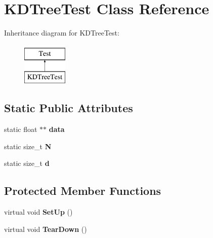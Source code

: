\hypertarget{classKDTreeTest}{\section{K\-D\-Tree\-Test Class Reference}
\label{classKDTreeTest}
}
Inheritance diagram for K\-D\-Tree\-Test\-:\begin{figure}[H]
\begin{center}
\leavevmode
\includegraphics[height=2.000000cm]{classKDTreeTest}
\end{center}
\end{figure}
\subsection*{Static Public Attributes}
\begin{DoxyCompactItemize}
\item 
\hypertarget{classKDTreeTest_a836729a070eb9537d0cc9c960e4e6ebb}{static float $\ast$$\ast$ {\bfseries data}}\label{classKDTreeTest_a836729a070eb9537d0cc9c960e4e6ebb}

\item 
\hypertarget{classKDTreeTest_aeb538469cef4399ec6911856a4c7e407}{static size\-\_\-t {\bfseries N}}\label{classKDTreeTest_aeb538469cef4399ec6911856a4c7e407}

\item 
\hypertarget{classKDTreeTest_ababb08a55d11ed0df1be2befe4bdba49}{static size\-\_\-t {\bfseries d}}\label{classKDTreeTest_ababb08a55d11ed0df1be2befe4bdba49}

\end{DoxyCompactItemize}
\subsection*{Protected Member Functions}
\begin{DoxyCompactItemize}
\item 
\hypertarget{classKDTreeTest_ae64f932fe7a552a1977397f5884e4696}{virtual void {\bfseries Set\-Up} ()}\label{classKDTreeTest_ae64f932fe7a552a1977397f5884e4696}

\item 
\hypertarget{classKDTreeTest_af827d1df2c003a2ae4e755ae2cc83703}{virtual void {\bfseries Tear\-Down} ()}\label{classKDTreeTest_af827d1df2c003a2ae4e755ae2cc83703}

\end{DoxyCompactItemize}
